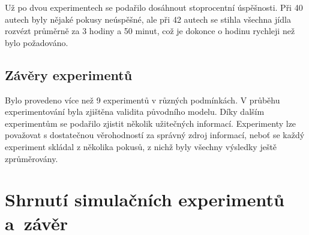 \documentclass[a4paper, 11pt]{article}
\begin{document}
	Už po dvou experimentech se podařilo dosáhnout stoprocentní úspěšnosti. Při 
	40 autech byly nějaké pokusy neúspěšné, ale při 42 autech se stihla všechna 
	jídla rozvézt průměrně za 3 hodiny a 50 minut, což je dokonce o hodinu rychleji
	než bylo požadováno.


	\subsection{Závěry experimentů}

	Bylo provedeno více než 9 experimentů v různých podmínkách. V průběhu experimentování
	byla zjištěna validita původního modelu. Díky dalším experimentům se podařilo zjistit
	několik užitečných informací. Experimenty lze považovat s dostatečnou věrohodností za
	správný zdroj informací, neboť se každý experiment skládal z několika pokusů, z nichž
	byly všechny výsledky ještě zprůměrovány.

	\section{Shrnutí simulačních experimentů a~závěr}



	\clearpage
	
	\renewcommand{\refname}{Literatura}
	



	\clearpage
	\appendix
\end{document}
